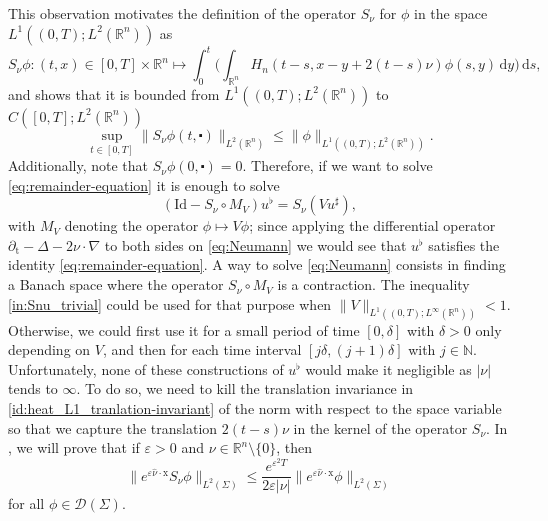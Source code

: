 \documentclass[10pt,a4paper]{amsart}
\newcommand{\R}{\mathbb{R}}
\newcommand{\N}{\mathbb{N}}
\newcommand{\dd}{\mathrm{d}}
\newcommand{\tm}{\mathrm{t}}
\newcommand{\x}{\mathrm{x}}
\newcommand{\Id}{\mathrm{Id}}
\newcommand{\marnote}[1]{\marginpar{\footnotesize #1}} %
\begin{document}
This observation motivates the definition of the operator $S_\nu$ for $\phi $
in the space $ L^1((0,T); L^2(\R^n))$ as
\[ S_\nu \phi: (t, x) \in [0, T] \times \R^n \longmapsto \int_0^t \Big( \int_{\R^n} H_n (t-s, x - y + 2(t-s) \nu) \phi(s, y) \, \dd y \Big) \, \dd s, \]
and shows that it is bounded from $ L^1((0,T); L^2(\R^n))$ to $C([0, T]; L^2(\R^n))$
\begin{equation}
\label{in:Snu_trivial}
\sup_{t \in [0, T]} \|S_\nu \phi (t, \centerdot)\|_{L^2(\R^n)} \leq \| \phi\|_{L^1((0,T); L^2(\R^n))}.
\end{equation}
Additionally, note that $S_\nu \phi (0, \centerdot)= 0$.
Therefore, if we want to solve \eqref{eq:remainder-equation} it is enough to solve
\begin{equation}
\label{eq:Neumann}
(\Id - S_\nu \circ M_V) u^\flat = S_\nu (V u^\sharp),
\end{equation}
with $M_V $ denoting the operator $ \phi \mapsto V \phi$; since applying the differential 
operator $\partial_\tm - \Delta - 2 \nu \cdot \nabla$ to both sides on 
\eqref{eq:Neumann} we would see that $u^\flat$ satisfies the identity 
\eqref{eq:remainder-equation}. A way to solve \eqref{eq:Neumann} consists in finding 
a Banach space where the operator $S_\nu \circ M_V$ is a contraction. The inequality 
\eqref{in:Snu_trivial} could be used for that purpose when 
$\| V \|_{L^1((0,T); L^\infty(\R^n))} < 1$. Otherwise, we could first use it 
for a small period of time $[0, \delta]$ with $\delta > 0$ only depending on $V$,
and then for each time interval
$[j \delta, (j+1)\delta]$ with $j \in \N$. Unfortunately, none of these constructions of $u^\flat$
would make it negligible as $|\nu|$ tends to $\infty$. To do so, we need to kill the translation
invariance in \eqref{id:heat_L1_tranlation-invariant} of the norm with respect to the space variable so 
that we capture the translation $2(t-s)\nu$ in the kernel of the operator $S_\nu$. In
, we will prove that if $\varepsilon > 0$ and $\nu \in \R^n \setminus\{ 0 \}$,
then
\begin{equation}
\label{in:Snu}
\| e^{\varepsilon \hat{\nu} \cdot \x} S_\nu \phi \|_{L^2(\Sigma)} \leq \frac{e^{\varepsilon^2 T}}{2 \varepsilon |\nu|} \| e^{\varepsilon \hat{\nu} \cdot \x} \phi \|_{L^2(\Sigma)}
\end{equation}
for all $\phi \in \mathcal{D}(\Sigma)$.
\end{document}
